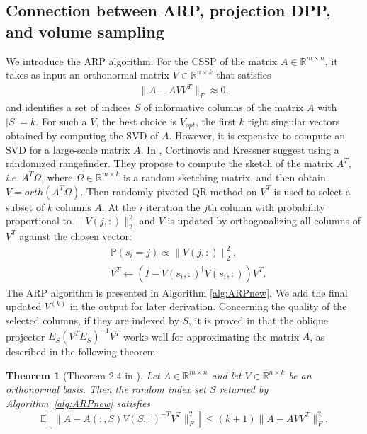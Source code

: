 \documentclass[11pt]{article}
\newtheorem{theorem}{Theorem}[section]
\newcommand{\be}{\begin{eqnarray}}
\newcommand{\ee}{\end{eqnarray}}
\newcommand{\R}{\mathbb{R}}
\newcommand{\<}{\langle}
\renewcommand{\>}{\rangle}
\begin{document}
\subsection{Connection between ARP, projection DPP, and volume sampling}
We introduce the ARP algorithm. For the CSSP of the matrix $A\in \R^{m\times n}$, it takes as input an orthonormal matrix $V\in \R^{n\times k}$ that satisfies
\be
\label{eq:rowspaceapprox}
\|A - AVV^T\|_F \approx 0,
\ee
and identifies a set of indices $S$ of informative columns of the matrix $A$ with $|S| = k$. For such a $V$, the best choice is $V_{opt}$, the first $k$ right singular vectors obtained by computing the SVD of $A$. However, it is expensive to compute an SVD for a large-scale matrix $A$. In \cite{cortinovis2025arp}, Cortinovis and Kressner suggest using a randomized rangefinder. They propose to compute the sketch of the matrix $A^T$, $i.e.\ A^T \Omega$, where $\Omega \in \R^{m \times k}$ is a random sketching matrix, and then obtain $V = orth(A^T \Omega)$. Then randomly pivoted QR method on $V^T$ is used to select a subset of $k$ columns $A$. At the $i$ iteration the $j$th column with probability proportional to $\|V(j,:)\|_2^2$ and $V$ is updated by orthogonalizing all columns of $V^T$ against the chosen vector:
\begin{subequations}
\begin{align}
    &\mathbb{P}(s_i = j) \propto \|V(j,:)\|_2^2,\\
    &V^T \leftarrow (I - V(s_i,:)^{\dagger}V(s_i,:))V^T.
\end{align}
\end{subequations}
The ARP algorithm is presented in Algorithm \ref{alg:ARPnew}. We add the final updated $V^{(k)}$ in the output for later derivation. Concerning the quality of the selected columns, if they are indexed by $S$, it is proved in \cite{cortinovis2025arp} that the oblique projector $E_{S}(V^TE_{S})^{-1}V^T$ works well for approximating the matrix $A$, as described in the following theorem.

\begin{theorem}[Theorem 2.4 in \cite{cortinovis2025arp}] \label{thm:arp}
    Let $A \in \R^{m \times n}$ and let $V \in \R^{n \times k}$ be an orthonormal basis. Then the random index set $S$ returned by Algorithm~\ref{alg:ARPnew} satisfies
    \begin{equation}\label{eq:arp_bound}
        \mathbb{E}\left [\|A - A(:,S) V(S,:)^{-T} V^T\|_F^2\right ] \leq (k+1) \|A - AVV^T\|_F^2.
    \end{equation}
\end{theorem}
\end{document}
